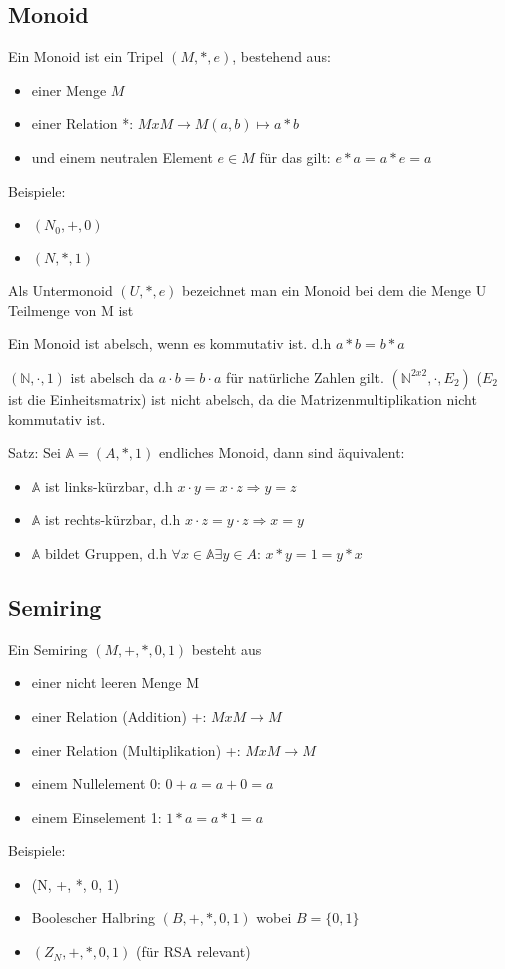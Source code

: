 
\subsection{Monoid}
Ein Monoid ist ein Tripel $(M,*,e)$, bestehend aus:
\begin{itemize}
\item einer Menge $M$
\item einer Relation *: $MxM \rightarrow M (a,b) \mapsto a*b$
\item und einem neutralen Element $e \in M$ für das gilt: $e*a = a*e = a$
\end{itemize}

Beispiele:
\begin{itemize}
\item $(N_{0}, +, 0)$
\item $(N, *, 1)$
\end{itemize}

Als Untermonoid $(U,*,e)$ bezeichnet man ein Monoid bei dem die Menge
U Teilmenge von M ist

Ein Monoid ist abelsch, wenn es kommutativ ist. d.h $a*b=b*a$

$(\mathbb{N},\cdot,1)$ ist abelsch da $a \cdot b = b \cdot a$ für
natürliche Zahlen gilt. $(\mathbb{N}^{2x2},\cdot,E_2)$ ($E_2$ ist die
Einheitsmatrix) ist nicht abelsch, da die Matrizenmultiplikation nicht
kommutativ ist.

Satz:  Sei $\mathbb{A} = (A,*,1)$ endliches Monoid, dann sind
äquivalent:
\begin{itemize}
\item $\mathbb{A}$ ist links-kürzbar, d.h $x \cdot y = x \cdot z \Rightarrow
  y = z$
\item $\mathbb{A}$ ist rechts-kürzbar, d.h $x \cdot z = y \cdot z \Rightarrow
  x = y$
\item $\mathbb{A}$ bildet Gruppen, d.h $\forall x \in \mathbb{A}
  \exists y \in A$: $x * y = 1 = y * x$
\end{itemize}

\subsection{Semiring}
Ein Semiring $(M, +, *, 0, 1)$ besteht aus
\begin{itemize}
\item einer nicht leeren Menge M
\item einer Relation (Addition) +: $MxM \rightarrow M$
\item einer Relation (Multiplikation) +: $MxM \rightarrow M$
\item einem Nullelement 0: $0+a = a+0 = a$
\item einem Einselement 1: $1*a = a*1 = a$
\end{itemize}

Beispiele:
\begin{itemize}
\item (N, +, *, 0, 1)
\item Boolescher Halbring $(B, +, *, 0, 1)$ wobei $B=\{0, 1\}$
\item $(Z_{N}, +, *, 0, 1)$ (für RSA relevant)
\end{itemize}


